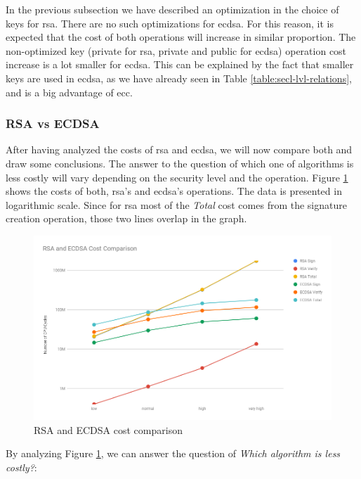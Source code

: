 \documentclass{llncs}
\begin{document}
In the previous subsection we have described an optimization in the choice of keys for \gls{rsa}. There are no such optimizations
for \gls{ecdsa}. For this reason, it is expected that the cost of both operations will increase in similar proportion. The non-optimized
key (private for \gls{rsa}, private and public for \gls{ecdsa}) operation cost increase is a lot smaller for \gls{ecdsa}. This can be
explained by the fact that smaller keys are used in \gls{ecdsa}, as we have already seen in Table \ref{table:secl-lvl-relations},
and is a big advantage of \gls{ecc}.

\subsubsection{RSA vs ECDSA} \label{sec:rsa-vs-ecdsa}

After having analyzed the costs of \gls{rsa} and \gls{ecdsa}, we will now compare both and draw some conclusions. The answer to the
question of which one of algorithms is less costly will vary depending on the security level and the operation. Figure \ref{fig:ecdsa-rsa-costs-all}
shows the costs of both, \gls{rsa}'s and \gls{ecdsa}'s operations. The data is presented in logarithmic scale. Since for \gls{rsa} most
of the \textit{Total} cost comes from the signature creation operation, those two lines overlap in the graph.

\begin{figure}
  \centering
  \includegraphics[width=1.0\textwidth]{img/rsa_ecdsa_costs_all.png}
  \centering \caption{\label{fig:ecdsa-rsa-costs-all} RSA and ECDSA cost comparison}
\end{figure}

By analyzing Figure \ref{fig:ecdsa-rsa-costs-all}, we can answer the question of \textit{Which algorithm is less costly?}:
\end{document}
